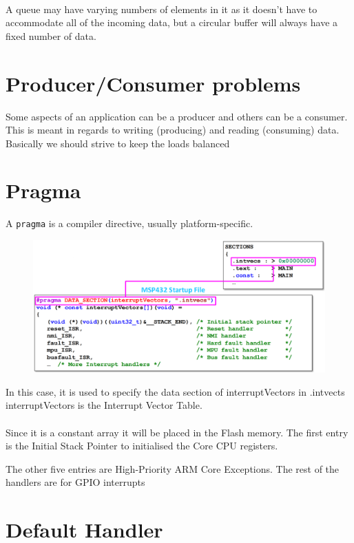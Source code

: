 \paragraph{}
A queue may have varying numbers of elements in it as it doesn't have to accommodate all of the incoming
data, but a circular buffer will always have a fixed number of data.


\section{Producer/Consumer problems}

Some aspects of an application can be a producer and others can be a consumer. This is meant in
regards to writing (producing) and reading (consuming) data. Basically we should strive to keep the loads
balanced

\section{Pragma}

A \verb|pragma| is a compiler directive, usually platform-specific.

\begin{figure}[H]
    \centering
    \includegraphics[width=0.75\linewidth]{img/image_62.png}
\end{figure}
In this case, it is used to specify the data section of interruptVectors in .intvects
interruptVectors is the Interrupt Vector Table.

\paragraph{}
Since it is a constant array it will be placed in the Flash memory.
The first entry is the Initial Stack Pointer to initialised the Core CPU registers.

The other five entries are High-Priority ARM Core Exceptions.
The rest of the handlers are for GPIO interrupts


\section{Default Handler}

